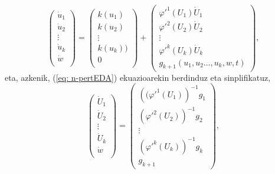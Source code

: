 \begin{equation*}
\left(\begin{array}{c}
                \dot{u}_1  \\
                \dot{u}_2  \\
                \vdots \\
                \dot{u}_k    \\
                \dot{w}      \\
\end{array}\right)=
\left(\begin{array}{c}
                k(u_1)  \\
                k(u_2)   \\
                \vdots \\
                k(u_k))   \\
                0      \\
\end{array}\right)+
\left(\begin{array}{c}
      \varphi'^1(U_1) \dot{U}_1 \\
      \varphi'^2(U_2) \dot{U}_2 \\
                \vdots \\
     \varphi'^k(U_k) \dot{U}_k\\
      g_{k+1}(u_1, u_2\dots, u_k,w,t)
\end{array}\right),
\end{equation*}
eta, azkenik, (\ref{eq: n-pertEDA}) ekuazioarekin berdinduz eta sinplifikatuz,
\begin{equation*}
\left(\begin{array}{c}
                \dot{U}_1  \\
                \dot{U}_2  \\
                \vdots \\
                \dot{U}_k    \\
                \dot{w}      \\
\end{array}\right)=
\left(\begin{array}{c}
      \left((\varphi'^1(U_1)\right)^{-1} g_1 \\
      \left(\varphi'^2(U_2)\right)^{-1} g_2 \\
                \vdots \\
     \left(\varphi'^k(U_k)\right)^{-1} g_k\\
      g_{k+1}
\end{array}\right),
\end{equation*}

